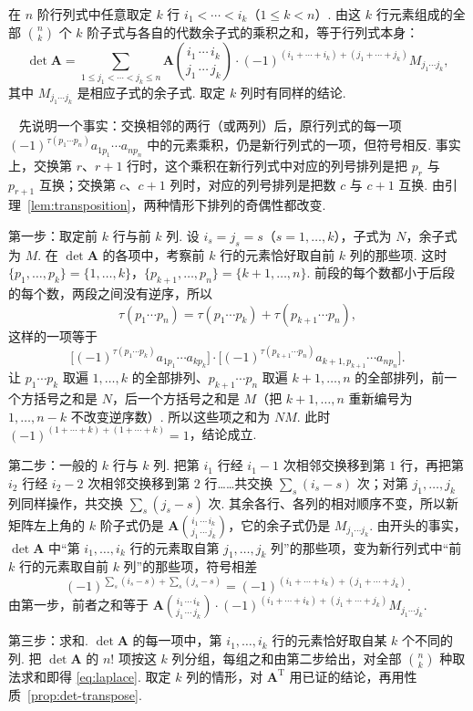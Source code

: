 \documentclass[lang=cn,10.5pt,scheme=chinese,toc=twocol,section,chinesefont=nofont,
twoside,citestyle=gb7714-2015,bibstyle=gb7714-2015]{elegantbook}
\DeclareRobustCommand{\textbf}[1]{{\lnsemiboldlatin\lnsemiboldcjk #1}}
\newcommand{\vv}[1]{\boldsymbol{#1}}
\newcommand{\trans}{\mathrm{T}}             %
\numberwithin{equation}{section}   %
\newcommand*{\lnlabel}[1]{{\sffamily\bfseries\color{black}#1}}
\renewenvironment{proof}{%
	\par\noindent\lnlabel{\proofname}\;\ \color{black!90}\cfs}{\par}
\begin{document}
\begin{theorem}[Laplace 定理]\label{thm:laplace}
  在 $n$ 阶行列式中任意取定 $k$ 行 $i_1<\cdots<i_k$（$1\le k<n$）. 由这 $k$ 行元素组成的全部 $\binom nk$ 个 $k$ 阶子式与各自的代数余子式的乘积之和，等于行列式本身：
  \begin{equation}
    \label{eq:laplace}
    \det\vv A=\sum_{1\le j_1<\cdots<j_k\le n}\vv A\binom{i_1\,\cdots\,i_k}{j_1\,\cdots\,j_k}\cdot(-1)^{(i_1+\cdots+i_k)+(j_1+\cdots+j_k)}M_{j_1\cdots j_k},
  \end{equation}
  其中 $M_{j_1\cdots j_k}$ 是相应子式的余子式. 取定 $k$ 列时有同样的结论.
\end{theorem}
\begin{proof}
  先说明一个事实：交换相邻的两行（或两列）后，原行列式的每一项 $(-1)^{\tau(p_1\cdots p_n)}a_{1p_1}\cdots a_{np_n}$ 中的元素乘积，仍是新行列式的一项，但符号相反. 事实上，交换第 $r$、$r+1$ 行时，这个乘积在新行列式中对应的列号排列是把 $p_r$ 与 $p_{r+1}$ 互换；交换第 $c$、$c+1$ 列时，对应的列号排列是把数 $c$ 与 $c+1$ 互换. 由引理~\ref{lem:transposition}，两种情形下排列的奇偶性都改变.

  \textbf{第一步：取定前 $k$ 行与前 $k$ 列.} 设 $i_s=j_s=s$（$s=1,\ldots,k$），子式为 $N$，余子式为 $M$. 在 $\det\vv A$ 的各项中，考察前 $k$ 行的元素恰好取自前 $k$ 列的那些项. 这时 $\{p_1,\ldots,p_k\}=\{1,\ldots,k\}$，$\{p_{k+1},\ldots,p_n\}=\{k+1,\ldots,n\}$. 前段的每个数都小于后段的每个数，两段之间没有逆序，所以
  \[
    \tau(p_1\cdots p_n)=\tau(p_1\cdots p_k)+\tau(p_{k+1}\cdots p_n),
  \]
  这样的一项等于
  \[
    \Big[(-1)^{\tau(p_1\cdots p_k)}a_{1p_1}\cdots a_{kp_k}\Big]\cdot\Big[(-1)^{\tau(p_{k+1}\cdots p_n)}a_{k+1,p_{k+1}}\cdots a_{np_n}\Big].
  \]
  让 $p_1\cdots p_k$ 取遍 $1,\ldots,k$ 的全部排列、$p_{k+1}\cdots p_n$ 取遍 $k+1,\ldots,n$ 的全部排列，前一个方括号之和是 $N$，后一个方括号之和是 $M$（把 $k+1,\ldots,n$ 重新编号为 $1,\ldots,n-k$ 不改变逆序数）. 所以这些项之和为 $NM$. 此时 $(-1)^{(1+\cdots+k)+(1+\cdots+k)}=1$，结论成立.

  \textbf{第二步：一般的 $k$ 行与 $k$ 列.} 把第 $i_1$ 行经 $i_1-1$ 次相邻交换移到第 $1$ 行，再把第 $i_2$ 行经 $i_2-2$ 次相邻交换移到第 $2$ 行……共交换 $\sum_s(i_s-s)$ 次；对第 $j_1,\ldots,j_k$ 列同样操作，共交换 $\sum_s(j_s-s)$ 次. 其余各行、各列的相对顺序不变，所以新矩阵左上角的 $k$ 阶子式仍是 $\vv A\binom{i_1\,\cdots\,i_k}{j_1\,\cdots\,j_k}$，它的余子式仍是 $M_{j_1\cdots j_k}$. 由开头的事实，$\det\vv A$ 中“第 $i_1,\ldots,i_k$ 行的元素取自第 $j_1,\ldots,j_k$ 列”的那些项，变为新行列式中“前 $k$ 行的元素取自前 $k$ 列”的那些项，符号相差
  \[
    (-1)^{\sum_s(i_s-s)+\sum_s(j_s-s)}=(-1)^{(i_1+\cdots+i_k)+(j_1+\cdots+j_k)}.
  \]
  由第一步，前者之和等于 $\vv A\binom{i_1\,\cdots\,i_k}{j_1\,\cdots\,j_k}\cdot(-1)^{(i_1+\cdots+i_k)+(j_1+\cdots+j_k)}M_{j_1\cdots j_k}$.

  \textbf{第三步：求和.} $\det\vv A$ 的每一项中，第 $i_1,\ldots,i_k$ 行的元素恰好取自某 $k$ 个不同的列. 把 $\det\vv A$ 的 $n!$ 项按这 $k$ 列分组，每组之和由第二步给出，对全部 $\binom nk$ 种取法求和即得 \eqref{eq:laplace}. 取定 $k$ 列的情形，对 $\vv A^\trans$ 用已证的结论，再用性质~\ref{prop:det-transpose}.
\end{proof}
\end{document}
